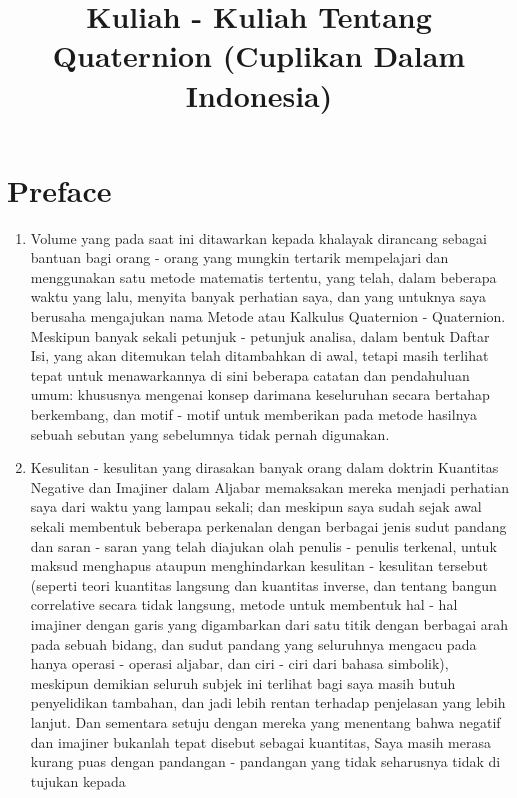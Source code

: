 \documentclass[a4paper, 12pt]{book}
\begin{document}
\title{\textbf{Kuliah - Kuliah Tentang Quaternion
(Cuplikan Dalam Indonesia)}}
\maketitle 

\chapter*{Preface}
\begin{enumerate}
\item Volume yang pada saat ini ditawarkan kepada khalayak dirancang sebagai 
bantuan bagi orang - orang yang mungkin tertarik mempelajari dan menggunakan
satu metode matematis tertentu, yang telah, dalam beberapa waktu yang lalu, 
menyita banyak perhatian saya, dan yang untuknya saya berusaha mengajukan nama
Metode atau Kalkulus Quaternion - Quaternion. Meskipun banyak sekali petunjuk -
petunjuk analisa, dalam bentuk Daftar Isi, yang akan ditemukan telah 
ditambahkan di awal, tetapi masih terlihat tepat untuk menawarkannya di sini 
beberapa catatan dan pendahuluan umum: khususnya mengenai konsep darimana 
keseluruhan secara bertahap berkembang, dan motif - motif untuk memberikan pada 
metode hasilnya sebuah sebutan yang sebelumnya tidak pernah digunakan.
\item Kesulitan - kesulitan yang dirasakan banyak orang dalam doktrin Kuantitas
Negative dan Imajiner dalam Aljabar memaksakan mereka menjadi perhatian saya 
dari waktu yang lampau sekali; dan meskipun saya sudah sejak awal sekali 
membentuk beberapa perkenalan dengan berbagai jenis sudut pandang dan saran 
- saran yang telah diajukan olah penulis - penulis terkenal, untuk maksud 
menghapus ataupun menghindarkan kesulitan - kesulitan tersebut (seperti teori 
kuantitas langsung dan kuantitas inverse, dan tentang bangun correlative 
secara tidak langsung, metode untuk membentuk hal - hal imajiner dengan garis 
yang digambarkan dari 
satu titik dengan berbagai arah pada sebuah bidang, dan sudut pandang yang 
seluruhnya mengacu pada hanya operasi - operasi aljabar, dan ciri - ciri dari
bahasa simbolik), meskipun demikian seluruh subjek ini terlihat bagi saya masih
butuh penyelidikan tambahan, dan jadi lebih rentan terhadap penjelasan yang 
lebih lanjut. Dan sementara setuju dengan mereka yang menentang bahwa negatif 
dan imajiner bukanlah tepat disebut sebagai kuantitas, Saya masih merasa kurang
puas dengan pandangan - pandangan yang tidak seharusnya tidak di tujukan kepada

\end{enumerate}
\end{document}
